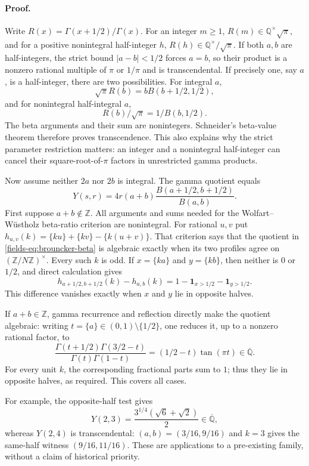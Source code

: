 \documentclass[11pt,a4paper]{article}
\theoremstyle{definition}
\theoremstyle{remark}
\numberwithin{equation}{section}
\begin{document}
\paragraph{Proof.}
Write $R(x)=\Gamma(x+1/2)/\Gamma(x)$. For an integer $m\geq1$,
$R(m)\in\mathbb Q^{\times}\sqrt\pi$, and for a positive nonintegral
half-integer $h$, $R(h)\in\mathbb Q^{\times}/\sqrt\pi$.
If both $a,b$ are half-integers, the strict bound $|a-b|<1/2$
forces $a=b$, so their product is a nonzero rational multiple of
$\pi$ or $1/\pi$ and is transcendental. If precisely one, say $a$,
is a half-integer, there are two possibilities. For integral $a$,
\[
 \sqrt\pi R(b)=b B(b+1/2,1/2),
\]
and for nonintegral half-integral $a$,
\[
 R(b)/\sqrt\pi=1/B(b,1/2).
\]
The beta arguments and their sum are nonintegers. Schneider's beta-value
theorem therefore proves transcendence. This also explains why the strict
parameter restriction matters: an integer and a nonintegral half-integer
can cancel their square-root-of-$\pi$ factors in unrestricted gamma products.

Now assume neither $2a$ nor $2b$ is integral. The gamma quotient equals
\begin{equation}\label{fields-eq:brouncker-beta}
 Y(s,r)=4r(a+b)\frac{B(a+1/2,b+1/2)}{B(a,b)}.
\end{equation}
First suppose $a+b\notin\mathbb Z$. All arguments and sums needed for
the Wolfart--W\"ustholz beta-ratio criterion \cite{dbkz-ww} are nonintegral.
For rational $u,v$ put
$h_{u,v}(k)=\{ku\}+\{kv\}-\{k(u+v)\}$.
That criterion says that the quotient in \eqref{fields-eq:brouncker-beta}
is algebraic exactly when its two profiles agree on $(\mathbb Z/N\mathbb Z)^\times$.
Every such $k$ is odd. If $x=\{ka\}$ and $y=\{kb\}$, then neither is
$0$ or $1/2$, and direct calculation gives
\[
 h_{a+1/2,b+1/2}(k)-h_{a,b}(k)
 =1-\mathbf1_{x>1/2}-\mathbf1_{y>1/2}.
\]
This difference vanishes exactly when $x$ and $y$ lie in opposite halves.

If $a+b\in\mathbb Z$, gamma recurrence and reflection directly make
the quotient algebraic: writing $t=\{a\}\in(0,1)\setminus\{1/2\}$,
one reduces it, up to a nonzero rational factor, to
\[
 \frac{\Gamma(t+1/2)\Gamma(3/2-t)}
 {\Gamma(t)\Gamma(1-t)}=(1/2-t)\tan(\pi t)\in\overline{\mathbb Q}.
\]
For every unit $k$, the corresponding fractional parts sum to $1$;
thus they lie in opposite halves, as required. This covers all cases.


For example, the opposite-half test gives
\[
 Y(2,3)=\frac{3^{1/4}(\sqrt6+\sqrt2)}2\in\overline{\mathbb Q},
\]
whereas $Y(2,4)$ is transcendental: $(a,b)=(3/16,9/16)$ and $k=3$
gives the same-half witness $(9/16,11/16)$. These are applications to a
pre-existing family, without a claim of historical priority.
\end{document}
